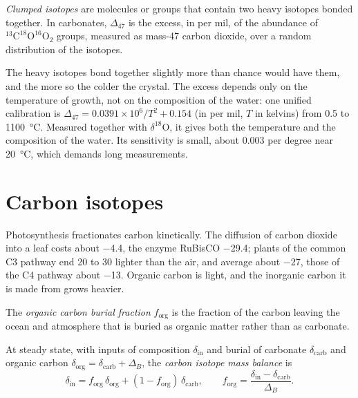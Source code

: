 \begin{definition}\label{def:b3:stable-isotopes:clumped}
\emph{Clumped isotopes} are molecules or groups that
contain two heavy isotopes bonded together. In carbonates, $\Delta_{47}$ is
the excess, in per mil, of the abundance of $^{13}\mathrm C^{18}\mathrm O^{16}\mathrm O_2$
groups, measured as mass-47 carbon dioxide, over a random distribution of the
isotopes.
\end{definition}

The heavy isotopes bond together slightly more than chance would have them,
and the more so the colder the crystal. The excess depends only on the
temperature of growth, not on the composition of the water: one unified
calibration is $\Delta_{47} = 0.0391\times10^6/T^2 + 0.154$ (in per mil, $T$
in kelvins) from 0.5 to \qty{1100}{\celsius}. Measured together with
$\delta^{18}\mathrm O$, it gives both the temperature and the composition of the
water. Its sensitivity is small, about \qty{0.003}{\permil} per degree near
\qty{20}{\celsius}, which demands long measurements.

\section{Carbon isotopes}\label{sec:b3:stable-isotopes:carbon}

Photosynthesis fractionates carbon kinetically. The diffusion of carbon
dioxide into a leaf costs about \qty{-4.4}{\permil}, the enzyme RuBisCO
\qty{-29.4}{\permil}; plants of the common C3 pathway end \num{20} to
\qty{30}{\permil} lighter than the air, and average about
\qty{-27}{\permil}, those of the C4 pathway about \qty{-13}{\permil}. Organic
carbon is light, and the inorganic carbon it is made from grows heavier.

\begin{definition}\label{def:b3:stable-isotopes:forg}
The \emph{organic carbon burial fraction}
$f_{\mathrm{org}}$ is the fraction of the carbon leaving the ocean and
atmosphere that is buried as organic matter rather than as carbonate.
\end{definition}

\begin{proposition}\label{prop:b3:stable-isotopes:forg}
At steady state, with inputs of composition $\delta_{\mathrm{in}}$ and burial of
carbonate $\delta_{\mathrm{carb}}$ and organic carbon $\delta_{\mathrm{org}} =
\delta_{\mathrm{carb}} + \Delta_B$, the \emph{carbon isotope mass
balance} is
\[
\delta_{\mathrm{in}} = f_{\mathrm{org}}\,\delta_{\mathrm{org}} + (1 - f_{\mathrm{org}})\,
\delta_{\mathrm{carb}}, \qquad f_{\mathrm{org}} = \frac{\delta_{\mathrm{in}} -
\delta_{\mathrm{carb}}}{\Delta_B}.
\]
\end{proposition}

